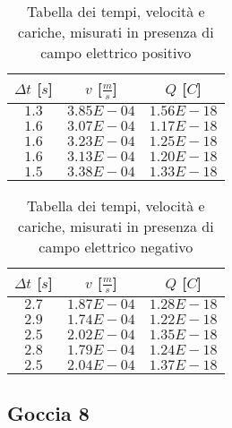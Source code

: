 \documentclass{article}
\begin{document}
\begin{multicols}{2}

\begin{table}[H]
	\centering
	\begin{tabular}{| c | c | c |}
		\hline
		$\Delta t$ [$s$] & $v$ [$\frac ms$] & $Q$ [$C$] \\
		\hline
		$1.3$ & $3.85E-04$ & $1.56E-18$ \\
		$1.6$ & $3.07E-04$ & $1.17E-18$ \\
		$1.6$ & $3.23E-04$ & $1.25E-18$ \\
		$1.6$ & $3.13E-04$ & $1.20E-18$ \\
		$1.5$ & $3.38E-04$ & $1.33E-18$ \\
		\hline
	\end{tabular}
	\caption{Tabella dei tempi, velocità e cariche, misurati in presenza di campo elettrico positivo}
	\label{}
\end{table}

\columnbreak

\begin{table}[H]
	\centering
	\begin{tabular}{| c | c | c |}
		\hline
		$\Delta t$ [$s$] & $v$ [$\frac ms$] & $Q$ [$C$] \\
		\hline
		$2.7$ & $1.87E-04$ & $1.28E-18$ \\
		$2.9$ & $1.74E-04$ & $1.22E-18$ \\
		$2.5$ & $2.02E-04$ & $1.35E-18$ \\
		$2.8$ & $1.79E-04$ & $1.24E-18$ \\
		$2.5$ & $2.04E-04$ & $1.37E-18$ \\
		\hline		
	\end{tabular}
	\caption{Tabella dei tempi, velocità e cariche, misurati in presenza di campo elettrico negativo}
	\label{}
\end{table}
	
\end{multicols}


\subsection{Goccia 8}
\end{document}
